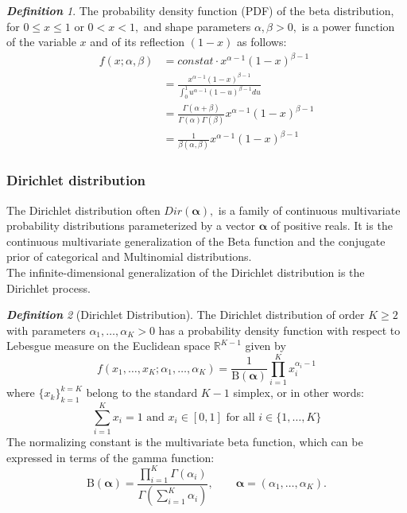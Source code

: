 \documentclass[12pt,oneside,a4paper]{book}
\theoremstyle{definition}
\theoremstyle{remark}
\newtheorem{defn}{\bf Definition}[subsection]
\begin{document}
					\begin{defn}
						The probability density function (PDF) of the beta distribution, for $0 \le x \le 1$ or $0 < x < 1,$ and shape parameters $\alpha, \beta > 0,$ is a power function of the variable $x$ and of its reflection $(1 - x)$ as follows:
						\begin{equation}
							\begin{aligned}
								f(x; \alpha,\beta) &= constat \cdot x^{\alpha-1} (1-x)^{\beta - 1}\\
								&= \frac{x^{\alpha-1} (1-x)^{\beta - 1}}{\int_{0}^{1} u^{\alpha - 1}(1-u)^{\beta - 1} du}\\
								&= \frac{\Gamma (\alpha+\beta)}{\Gamma(\alpha)\Gamma(\beta)}x^{\alpha - 1}(1 - x)^{\beta - 1}\\
								&= \frac{1}{\beta(\alpha,\beta)}x^{\alpha - 1}(1 - x)^{\beta - 1}
							\end{aligned}
						\end{equation}
					\end{defn}
				\subsubsection{Dirichlet distribution}
					The Dirichlet distribution often	$Dir({\boldsymbol {\alpha }}),$ is a family of continuous multivariate probability distributions parameterized by a vector ${\boldsymbol {\alpha }}$ of positive reals.
					It is the continuous multivariate generalization of the Beta function and the conjugate prior of categorical and Multinomial distributions.\\
					The infinite-dimensional generalization of the Dirichlet distribution is the Dirichlet process.

				\begin{defn}[Dirichlet Distribution] \cite{Minka2012EstimatingAD}
						The Dirichlet distribution of order $K \ge 2$ with parameters $\alpha_1, \dots, \alpha_K > 0$ has a probability density function with respect to Lebesgue measure on the Euclidean space $\mathbb{R}^{K-1}$ given by
						\begin{equation}
							f\left(x_{1},\ldots ,x_{K};\alpha _{1},\ldots ,\alpha _{K}\right)={\frac {1}{\mathrm {B} ({\boldsymbol {\alpha }})}}\prod _{i=1}^{K}x_{i}^{\alpha _{i}-1}
						\end{equation}
						where $\{x_{k}\}_{k=1}^{k=K}$ belong to the standard $K-1$ simplex, or in other words:
						\begin{equation}
							\sum _{i=1}^{K}x_{i}=1{\mbox{ and }}x_{i}\in \left[0,1\right]{\mbox{ for all }}i\in \{1,\dots ,K\}
						\end{equation}
						The normalizing constant is the multivariate beta function, which can be expressed in terms of the gamma function:
						\begin{equation}
							\mathrm {B} ({\boldsymbol {\alpha }}) = {
								\frac {\prod \limits _{i=1}^{K}\Gamma (\alpha _{i})}
								{\Gamma \left(\sum \limits _{i=1}^{K}\alpha _{i}\right)}},
							\qquad {\boldsymbol {\alpha }}=(\alpha _{1},\ldots ,\alpha _{K}).
						\end{equation}
					\end{defn}
\end{document}
